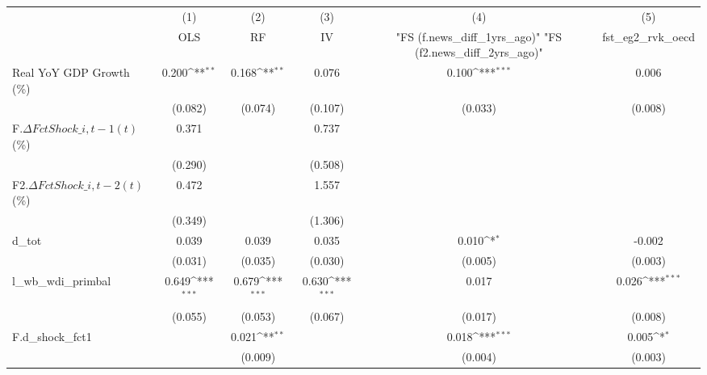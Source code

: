 {
\def\sym#1{\ifmmode^{#1}\else\(^{#1}\)\fi}
\begin{tabular}{l*{5}{c}}
\toprule
                    &\multicolumn{1}{c}{(1)}&\multicolumn{1}{c}{(2)}&\multicolumn{1}{c}{(3)}&\multicolumn{1}{c}{(4)}&\multicolumn{1}{c}{(5)}\\
                    &\multicolumn{1}{c}{OLS}&\multicolumn{1}{c}{RF}&\multicolumn{1}{c}{IV}&\multicolumn{1}{c}{ "FS (f.news\_diff\_1yrs\_ago)"  "FS (f2.news\_diff\_2yrs\_ago)" }&\multicolumn{1}{c}{fst\_eg2\_rvk\_oecd}\\
\midrule
Real YoY GDP Growth (\%)&       0.200\sym{**} &       0.168\sym{**} &       0.076         &       0.100\sym{***}&       0.006         \\
                    &     (0.082)         &     (0.074)         &     (0.107)         &     (0.033)         &     (0.008)         \\
\addlinespace
F.$\Delta FctShock\_{i,t-1}(t)$ (\%)&       0.371         &                     &       0.737         &                     &                     \\
                    &     (0.290)         &                     &     (0.508)         &                     &                     \\
\addlinespace
F2.$\Delta FctShock\_{i,t-2}(t)$ (\%)&       0.472         &                     &       1.557         &                     &                     \\
                    &     (0.349)         &                     &     (1.306)         &                     &                     \\
\addlinespace
d\_tot               &       0.039         &       0.039         &       0.035         &       0.010\sym{*}  &      -0.002         \\
                    &     (0.031)         &     (0.035)         &     (0.030)         &     (0.005)         &     (0.003)         \\
\addlinespace
l\_wb\_wdi\_primbal    &       0.649\sym{***}&       0.679\sym{***}&       0.630\sym{***}&       0.017         &       0.026\sym{***}\\
                    &     (0.055)         &     (0.053)         &     (0.067)         &     (0.017)         &     (0.008)         \\
\addlinespace
F.d\_shock\_fct1      &                     &       0.021\sym{**} &                     &       0.018\sym{***}&       0.005\sym{*}  \\
                    &                     &     (0.009)         &                     &     (0.004)         &     (0.003)         \\

\end{tabular}}
